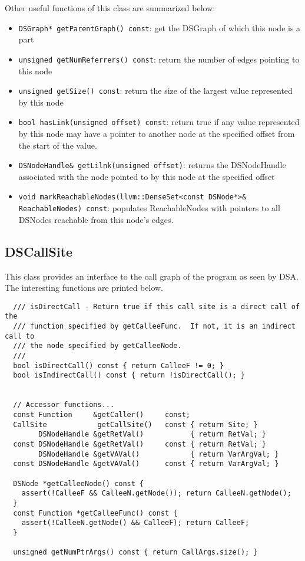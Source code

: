 \documentclass{article}
\begin{document}
Other useful functions of this class are summarized below:
\begin{itemize}
\item \texttt{DSGraph* getParentGraph() const}: get the DSGraph of
  which this node is a part
\item \texttt{unsigned getNumReferrers() const}: return the number of
  edges pointing to this node
\item \texttt{unsigned getSize() const}: return the size of the
  largest value represented by this node
\item \texttt{bool hasLink(unsigned offset) const}: return true if any
  value represented by this node may have a pointer to another node at
  the specified offset from the start of the value.
\item \texttt{DSNodeHandle\& getLilnk(unsigned offset)}: returns the
  DSNodeHandle associated with the node pointed to by this node at the
  specified offset
\item \texttt{void markReachableNodes(llvm::DenseSet<const DSNode*>\&
  ReachableNodes) const}: populates ReachableNodes with pointers to
  all DSNodes reachable from this node's edges.
\end{itemize}

\subsection{DSCallSite}

This class provides an interface to the call graph of the program as
seen by DSA.  The interesting functions are printed below.
\begin{verbatim}
  /// isDirectCall - Return true if this call site is a direct call of the
  /// function specified by getCalleeFunc.  If not, it is an indirect call to
  /// the node specified by getCalleeNode.
  ///
  bool isDirectCall() const { return CalleeF != 0; }
  bool isIndirectCall() const { return !isDirectCall(); }


  // Accessor functions...
  const Function     &getCaller()     const;
  CallSite            getCallSite()   const { return Site; }
        DSNodeHandle &getRetVal()           { return RetVal; }
  const DSNodeHandle &getRetVal()     const { return RetVal; }
        DSNodeHandle &getVAVal()            { return VarArgVal; }
  const DSNodeHandle &getVAVal()      const { return VarArgVal; }

  DSNode *getCalleeNode() const {
    assert(!CalleeF && CalleeN.getNode()); return CalleeN.getNode();
  }
  const Function *getCalleeFunc() const {
    assert(!CalleeN.getNode() && CalleeF); return CalleeF;
  }

  unsigned getNumPtrArgs() const { return CallArgs.size(); }
\end{verbatim}
\end{document}
